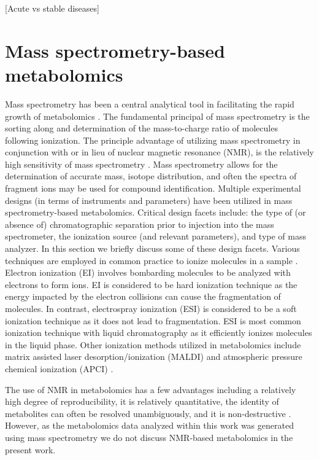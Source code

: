 \begin{DoubleSpace*}
 \cite{johnson2016}

[Acute vs stable diseases]

\section{Mass spectrometry-based metabolomics}
Mass spectrometry has been a central analytical tool in facilitating the rapid growth of metabolomics \cite{dunn2013}. The fundamental principal of mass spectrometry is the sorting along and determination of the mass-to-charge ratio of molecules following ionization. The principle advantage of utilizing mass spectrometry in conjunction with or in lieu of nuclear magnetic resonance (NMR), is the relatively high sensitivity of mass spectrometry \cite{sumner2011,gowda2014,jurgen2017}. Mass spectrometry allows for the determination of accurate mass, isotope distribution, and often the spectra of fragment ions may be used for compound identification. Multiple experimental designs (in terms of instruments and parameters) have been utilized in mass spectrometry-based metabolomics. Critical design facets include: the type of (or absence of) chromatographic separation prior to injection into the mass spectrometer, the ionization source (and relevant parameters), and type of mass analyzer. In this section we briefly discuss some of these design facets. Various techniques are employed in common practice to ionize molecules in a sample \cite{sumner2011,gowda2014,jurgen2017}. Electron ionization (EI) involves bombarding molecules to be analyzed with electrons to form ions. EI is considered to be hard ionization technique as the energy impacted by the electron collisions can cause the fragmentation of molecules. In contrast, electrospray ionization (ESI) is considered to be a soft ionization technique as it does not lead to fragmentation. ESI is most common ionization technique with liquid chromatography as it efficiently ionizes molecules in the liquid phase. Other ionization methods utilized in metabolomics include matrix assisted laser desorption/ionization (MALDI) and atmospheric pressure chemical ionization (APCI) \cite{sumner2011}.

The use of NMR in metabolomics has a few advantages including a relatively high degree of reproducibility, it is relatively quantitative, the identity of metabolites can often be resolved unambiguously, and it is non-destructive \cite{gowda2016}. However, as the metabolomics data analyzed within this work was generated using mass spectrometry we do not discuss NMR-based metabolomics in the present work.

\end{DoubleSpace*}
